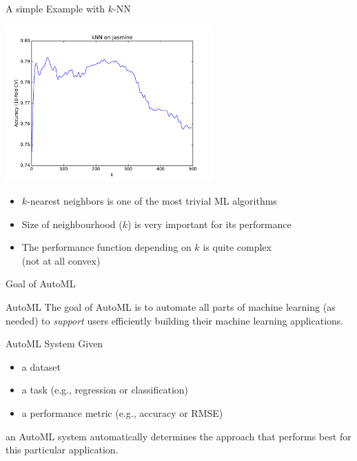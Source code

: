 \begin{frame}[c]{A simple Example with $k$-NN}

\centering
\includegraphics[width=0.6\textwidth]{images/kNN-jasmine}

\begin{itemize}
  \item $k$-nearest neighbors is one of the most trivial ML algorithms
  \item Size of neighbourhood ($k$) is very important for its performance
  \item The performance function depending on $k$ is quite complex\\ (not at all convex)
\end{itemize}

\end{frame}
\begin{frame}[c]{Goal of AutoML}

\begin{block}{AutoML}
The goal of AutoML is to automate all parts of machine learning (as needed)
to \emph{support} users efficiently building their machine learning applications.
\end{block}

\bigskip

\begin{block}{AutoML System}
Given
\begin{itemize}
  \item a dataset
  \item a task (e.g., regression or classification)
  \item a performance metric (e.g., accuracy or RMSE)
\end{itemize}
an AutoML system automatically determines the approach 
that performs best for this particular application.
\end{block}

\end{frame}
